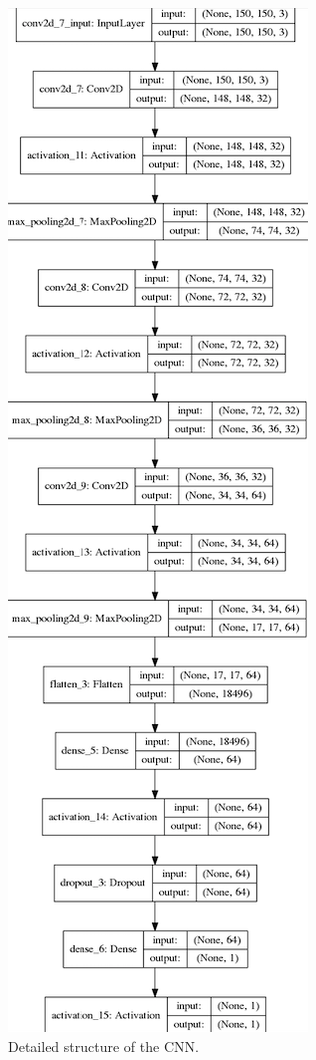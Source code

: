 \documentclass[conference]{IEEEtran}
\begin{document}
\begin{figure}[htbp]
\centerline{\includegraphics[scale=1]{./model_plt.png}}
\caption{Detailed structure of the CNN.}
\label{fig}
\end{figure}
\end{document}
